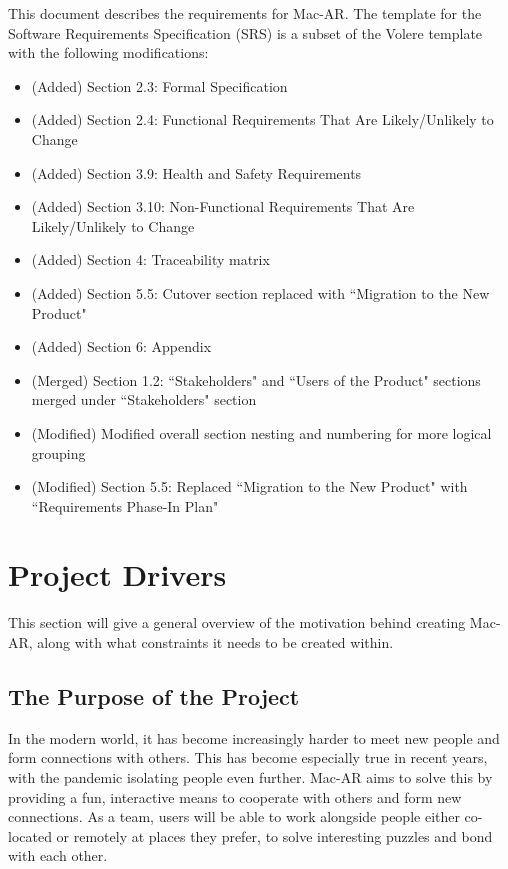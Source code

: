 \documentclass[12pt]{article}
\begin{document}
This document describes the requirements for Mac-AR. The template for the Software Requirements
Specification (SRS) is a subset of the Volere template~\citep{RobertsonAndRobertson2012} with the following modifications:
\begin{itemize}
    \item (Added) Section 2.3: Formal Specification
    \item (Added) Section 2.4: Functional Requirements That Are Likely/Unlikely to Change
    \item (Added) Section 3.9: Health and Safety Requirements
    \item (Added) Section 3.10: Non-Functional Requirements That Are Likely/Unlikely to Change
    \item (Added) Section 4: Traceability matrix
    \item (Added) Section 5.5: Cutover section replaced with ``Migration to the New Product"
    \item (Added) Section 6: Appendix
    \item (Merged) Section 1.2: ``Stakeholders" and ``Users of the Product" sections merged under ``Stakeholders" section
    \item (Modified) Modified overall section nesting and numbering for more logical grouping
    \item (Modified) Section 5.5: Replaced ``Migration to the New Product" with ``Requirements Phase-In Plan"
\end{itemize}

\newpage

\section{Project Drivers}

This section will give a general overview of the motivation behind creating Mac-AR, along with what constraints it needs to be created within. 

\subsection{The Purpose of the Project}
In the modern world, it has become increasingly harder to meet new people and form connections with others. This has become especially true in recent years, with the pandemic isolating people even further. Mac-AR aims to solve this by providing a fun, interactive means to cooperate with others and form new connections. As a team, users will be able to work alongside people either co-located or remotely at places they prefer, to solve interesting puzzles and bond with each other.
\end{document}
